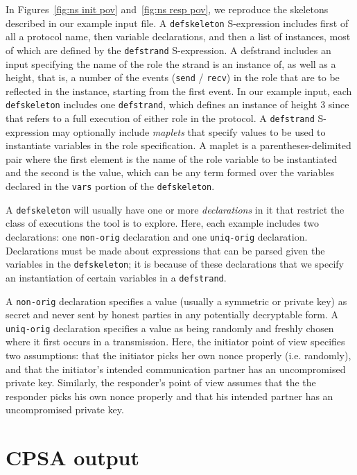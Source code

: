 In Figures~\ref{fig:ns init pov} and~\ref{fig:ns resp pov}, we
reproduce the skeletons described in our example input file.  A
\texttt{defskeleton} S-expression includes first of all a protocol
name, then variable declarations, and then a list of instances, most
of which are defined by the \texttt{defstrand} S-expression.  A
defstrand includes an input specifying the name of the role the strand
is an instance of, as well as a height, that is, a number of the
events (\texttt{send} / \texttt{recv}) in the role that are to be
reflected in the instance, starting from the first event.  In our
example input, each \texttt{defskeleton} includes one
\texttt{defstrand}, which defines an instance of height 3 since that
refers to a full execution of either role in the protocol.  A
\texttt{defstrand} S-expression may optionally include
\emph{maplets} that specify values to be used to
instantiate variables in the role specification.  A maplet is a
parentheses-delimited pair where the first element is the name of the
role variable to be instantiated and the second is the value, which
can be any term formed over the variables declared in the
\texttt{vars} portion of the \texttt{defskeleton}.

  A \texttt{defskeleton} will usually
have one or more \emph{declarations} in it that restrict the class of
executions the tool is to explore.  Here, each example includes two
declarations: one \texttt{non-orig} declaration and one
\texttt{uniq-orig} declaration.  Declarations must be made about
expressions that can be parsed given the variables in the
\texttt{defskeleton}; it is because of these declarations that we
specify an instantiation of certain variables in a \texttt{defstrand}.

A \texttt{non-orig} declaration specifies a value (usually a symmetric
or private key) as secret and never sent by honest parties in any
potentially decryptable form.  A \texttt{uniq-orig} declaration
specifies a value as being randomly and freshly chosen where it first
occurs in a transmission.  Here, the initiator point of view specifies
two assumptions: that the initiator picks her own nonce properly
(i.e. randomly), and that the initiator's intended communication
partner has an uncompromised private key.  Similarly, the responder's
point of view assumes that the the responder picks his own nonce
properly and that his intended partner has an uncompromised private
key.

\section{CPSA output}

